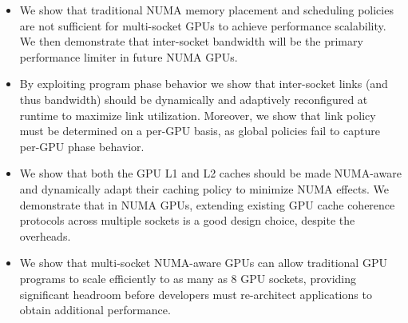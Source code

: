 \begin{itemize}
\vspace{-.05in}
\item We show that traditional NUMA memory placement and 
scheduling policies are not sufficient for multi-socket GPUs to achieve 
performance scalability. We then demonstrate that inter-socket bandwidth will be 
the primary performance limiter in future NUMA GPUs.
\vspace{-.05in}
\item By exploiting program phase behavior we show that inter-socket links (and 
thus bandwidth) should be dynamically and adaptively reconfigured at runtime to maximize link 
utilization. Moreover, we show that link policy must be determined on a per-GPU 
basis, as global policies fail to capture per-GPU phase behavior.
\vspace{-.05in}
\item We show that both the GPU L1 and L2 caches should be made NUMA-aware 
and dynamically adapt their caching policy to minimize NUMA effects. We demonstrate
that in NUMA GPUs, extending existing GPU cache coherence protocols
across multiple sockets is a good design choice, despite the overheads.
\vspace{-.05in}
\item We show that multi-socket NUMA-aware GPUs can allow traditional 
GPU programs to scale efficiently to as many as 8 GPU sockets, providing significant 
headroom before developers must re-architect applications to obtain additional performance.

\end{itemize}
